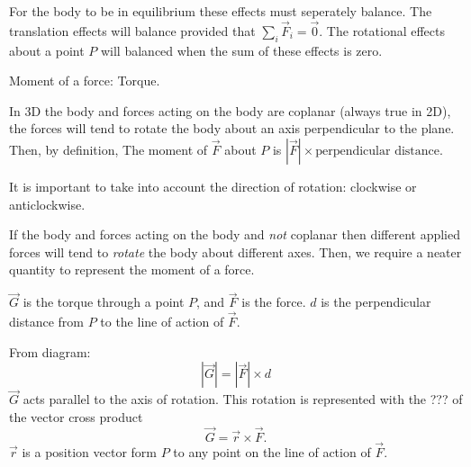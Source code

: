 \documentclass[12pt]{article}
\begin{document}
For the body to be in equilibrium these effects must seperately balance.
The translation effects will balance provided that $\sum\limits_{i}^{}\vec{F}_i = \vec{0}$.
The rotational effects about a point $P$ will balanced
when the sum of these effects is zero.


Moment of a force: Torque.

In 3D the body and forces acting on the body are coplanar (always true in 2D),
the forces will tend to rotate the body about an
axis perpendicular to the plane. Then, by definition,
The moment of $\vec{F}$ about $P$ is $|\vec{F}| \times \text{perpendicular distance}$.

It is important to take into account
the direction of rotation: clockwise or anticlockwise.

If the body and forces acting on the body
and \emph{not} coplanar then different applied
forces will tend to \emph{rotate} the
body about different axes. Then,
we require a neater quantity to represent the
moment of a force.

$\vec{G}$ is the torque through a point $P$, and $\vec{F}$ is the force.
$d$ is the perpendicular distance from $P$ to the line of action of $\vec{F}$.

From diagram:
\[
|\vec{G}| = |\vec{F}| \times d
\]
$\vec{G}$ acts parallel to the axis of rotation.
This rotation is represented with the ???
of the vector cross product
\begin{equation}
    \vec{G} = \vec{r} \times \vec{F}.
\end{equation}
$\vec{r}$ is a position vector form $P$ to any point
on the line of action of $\vec{F}$.
\end{document}
